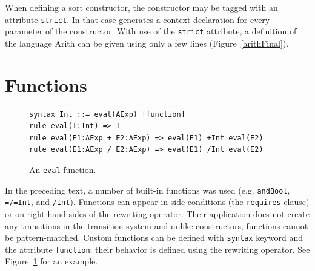 \documentclass[nolot,nolof,nocover,printed]{fithesis3}
\begin{document}
When defining a sort constructor, the constructor may be tagged with an attribute \texttt{strict}. In that case \K generates a context declaration for every parameter of the constructor. With use of the \texttt{strict} attribute, a definition of the language Arith can be given using only a few lines (Figure~\ref{arithFinal}).


\section{Functions}

\begin{figure}
\begin{lstlisting}
syntax Int ::= eval(AExp) [function]
rule eval(I:Int) => I
rule eval(E1:AExp + E2:AExp) => eval(E1) +Int eval(E2)
rule eval(E1:AExp / E2:AExp) => eval(E1) /Int eval(E2)
\end{lstlisting}
\caption{An \texttt{eval} function.}
\label{figAnEvalFunction}
\end{figure}

In the preceding text, a number of built-in functions was used (e.g. \texttt{andBool}, \texttt{=/=Int}, and \texttt{/Int}). Functions can appear in side conditions (the \texttt{requires} clause) or on right-hand sides of the rewriting operator. Their application does not create any transitions in the transition system and unlike constructors, functions cannot be pattern-matched. Custom functions can be defined with \texttt{syntax} keyword and the attribute \texttt{function}; their behavior is defined using the rewriting operator. See Figure~\ref{figAnEvalFunction} for an example. 





\end{document}
